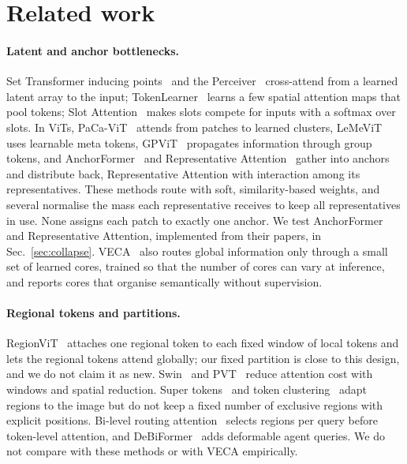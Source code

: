 \documentclass[10pt]{article}
\begin{document}
\section{Related work}

\paragraph{Latent and anchor bottlenecks.}
Set Transformer inducing points~\citep{lee2019settransformer} and the
Perceiver~\citep{jaegle2021perceiver} cross-attend from a learned latent array to the input;
TokenLearner~\citep{ryoo2021tokenlearner} learns a few spatial attention maps that pool tokens;
Slot Attention~\citep{locatello2020slot} makes slots compete for inputs with a softmax over
slots. In ViTs, PaCa-ViT~\citep{grainger2023paca} attends from patches to learned clusters,
LeMeViT~\citep{jiang2024lemevit} uses learnable meta tokens, GPViT~\citep{yang2023gpvit}
propagates information through group tokens, and AnchorFormer~\citep{anchorformer2025} and
Representative Attention~\citep{representative2026} gather into anchors and distribute back,
Representative Attention with interaction among its representatives. These methods route with
soft, similarity-based weights, and several normalise the mass each representative receives to
keep all representatives in use. None assigns each patch to exactly one anchor. We test
AnchorFormer and Representative Attention, implemented from their papers, in
Sec.~\ref{sec:collapse}. VECA~\citep{song2026veca} also routes global information only through a
small set of learned cores, trained so that the number of cores can vary at inference, and
reports cores that organise semantically without supervision.

\paragraph{Regional tokens and partitions.}
RegionViT~\citep{chen2022regionvit} attaches one regional token to each fixed window of local
tokens and lets the regional tokens attend globally; our fixed partition is close to this design,
and we do not claim it as new. Swin~\citep{liu2021swin} and PVT~\citep{wang2022pvtv2} reduce
attention cost with windows and spatial reduction. Super tokens~\citep{huang2023supertoken} and
token clustering~\citep{zeng2022tcformer,zeng2024tcformer} adapt regions to the image but do not
keep a fixed number of exclusive regions with explicit positions. Bi-level routing
attention~\citep{zhu2023biformer} selects regions per query before token-level attention, and
DeBiFormer~\citep{baolong2024debiformer} adds deformable agent queries. We do not compare with
these methods or with VECA empirically.
\end{document}
